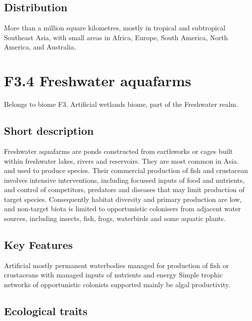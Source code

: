 \documentclass[
  letterpaper,
  DIV=11,
  numbers=noendperiod]{scrartcl}
\begin{document}
\subsection{Distribution}\label{distribution-128}

More than a million square kilometres, mostly in tropical and
subtropical Southeast Asia, with small areas in Africa, Europe, South
America, North America, and Australia.

\section{F3.4 Freshwater aquafarms}\label{f3.4-freshwater-aquafarms-1}

Belongs to biome F3. Artificial wetlands biome, part of the Freshwater
realm.

\subsection{Short description}\label{short-description-129}

Freshwater aquafarms are ponds constructed from earthworks or cages
built within freshwater lakes, rivers and reservoirs. They are most
common in Asia. and used to produce species. Their commercial production
of fish and crustacean involves intensive interventions, including
focussed inputs of food and nutrients, and control of competitors,
predators and diseases that may limit production of target species.
Consequently habitat diversity and primary production are low, and
non-target biota is limited to opportunistic colonisers from adjacent
water sources, including insects, fish, frogs, waterbirds and some
aquatic plants.

\subsection{Key Features}\label{key-features-129}

Artificial mostly permanent waterbodies managed for production of fish
or crustaceans with managed inputs of nutrients and energy Simple
trophic networks of opportunistic colonists supported mainly be algal
productivity.

\subsection{Ecological traits}\label{ecological-traits-129}
\end{document}
